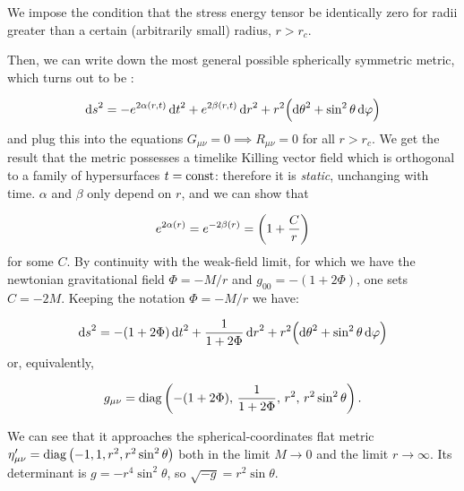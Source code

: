 \documentclass[main.tex]{subfiles}
\begin{document}
We impose the condition that the stress energy tensor be identically zero for radii greater than a certain (arbitrarily small) radius, \(r > r_c\).

Then, we can write down the most general possible spherically symmetric metric, which turns out to be \cite[eq. 7.13]{Carroll:1997ar}:

\begin{equation}
  \dd{s} ^2 = -e^{2 \alpha(r, t)} \dd{t}^2 + e^{2 \beta(r, t)} \dd{r}^2
  + r^2 \qty(\dd{\theta}^2 + \sin^2\theta \dd{\varphi})
\end{equation}
and plug this into the equations \(G_{\mu\nu} = 0 \implies R_{\mu\nu} = 0 \) for all \(r>r_c\).
We get the result that the metric possesses a timelike Killing vector field which is orthogonal to a family of hypersurfaces \(t = \operatorname{const}\): therefore it is \emph{static}, unchanging with time.
\(\alpha\) and \(\beta\) only depend on \(r\), and we can show that

\begin{equation}
  e^{2 \alpha(r)} = e^{-2 \beta(r)} = \qty(1 + \frac{C}{r})
\end{equation}
for some \(C\). By continuity with the weak-field limit, for which we have the newtonian gravitational field \(\Phi = -M/r\) and \(g_{00} = - (1 + 2 \Phi)\), one sets \(C = -2M\).
Keeping the notation \(\Phi = -M/r\) we have:

\begin{equation}
    \dd{s}^2 = -(1+2\Phi)\dd{t}^2 + \frac{1}{1+2\Phi} \dd{r}^2
    + r^2 \qty(\dd{\theta}^2 + \sin^2\theta \dd{\varphi}) \label{eq:schwartzshild-line-element}
\end{equation}
or, equivalently,

\begin{equation}
    g_{\mu\nu} =  \diag\qty(-(1+2\Phi),\, \frac{1}{1+2\Phi},\, r^2,\, r^2 \sin ^2 \theta ) \,.
\end{equation}

We can see that it approaches the spherical-coordinates flat metric $\eta_{\mu\nu} ^{\prime} = \operatorname{diag}\qty(-1, 1, r^2, r^2 \sin ^2 \theta)$ both in the limit $M\rightarrow 0$ and the limit \(r \rightarrow \infty\). Its determinant is $g = -r^4 \sin^2 \theta$, so \(\sqrt{-g} = r^2 \sin \theta \).
\end{document}
